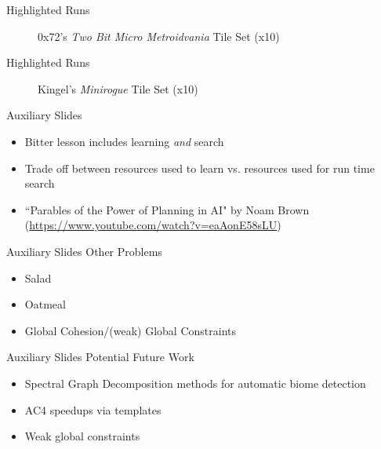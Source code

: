 \documentclass{beamer}
\begin{document}
  \begin{frame}[fragile]{Highlighted Runs}
    \begin{figure}
      0x72's \textit{Two Bit Micro Metroidvania} Tile Set (x10)
    \end{figure}
  \end{frame}

  \begin{frame}[fragile]{Highlighted Runs}
    \begin{figure}
      Kingel's \textit{Minirogue} Tile Set (x10)
    \end{figure}
  \end{frame}


  \begin{frame}[fragile]{Auxiliary Slides}
    \begin{itemize}
      \item Bitter lesson includes learning \textit{and} search
      \item Trade off between resources used to learn vs. resources used for run time search
      \item ``Parables of the Power of Planning in AI" by Noam Brown (\url{https://www.youtube.com/watch?v=eaAonE58sLU})
    \end{itemize}
  \end{frame}

  \begin{frame}[fragile]{Auxiliary Slides}
    Other Problems

    \begin{itemize}
      \item Salad
      \item Oatmeal
      \item Global Cohesion/(weak) Global Constraints
    \end{itemize}
  \end{frame}


  \begin{frame}[fragile]{Auxiliary Slides}
    Potential Future Work

    \begin{itemize}
      \item Spectral Graph Decomposition methods for automatic biome detection
      \item AC4 speedups via templates
      \item Weak global constraints
    \end{itemize}
  \end{frame}
\end{document}
